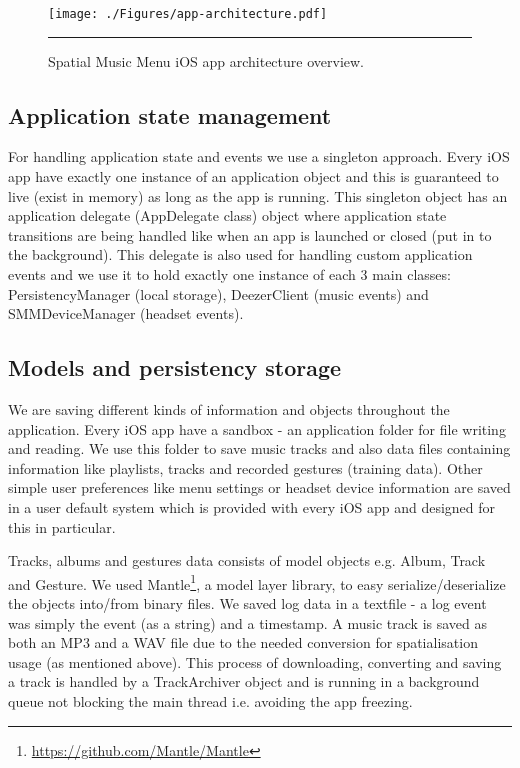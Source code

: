 \begin{figure}[t]
  \centering
    \texttt{[image: ./Figures/app-architecture.pdf]}
    \rule{35em}{1pt}
  \caption[App architecture]{Spatial Music Menu iOS app architecture overview.}
  \label{fig:apparchitecture}
\end{figure}

\subsection{Application state management}
For handling application state and events we use a singleton approach. Every iOS app have exactly one instance of an application object and this is guaranteed to live (exist in memory) as long as the app is running. This singleton object has an application delegate (AppDelegate class) object where application state transitions are being handled like when an app is launched or closed (put in to the background). This delegate is also used for handling custom application events and we use it to hold exactly one instance of each 3 main classes: PersistencyManager (local storage), DeezerClient (music events) and SMMDeviceManager (headset events). 

\subsection{Models and persistency storage}
\label{sec:modelsandpersistency}
We are saving different kinds of information and objects throughout the application. Every iOS app have a sandbox - an application folder for file writing and reading. We use this folder to save music tracks and also data files containing information like playlists, tracks and recorded gestures (training data). Other simple user preferences like menu settings or headset device information are saved in a user default system which is provided with every iOS app and designed for this in particular.

Tracks, albums and gestures data consists of model objects e.g. Album, Track and Gesture. We used Mantle\footnote{\url{https://github.com/Mantle/Mantle}}, a model layer library, to easy serialize/deserialize the objects into/from binary files. We saved log data in a textfile - a log event was simply the event (as a string) and a timestamp. A music track is saved as both an MP3 and a WAV file due to the needed conversion for spatialisation usage (as mentioned above). This process of downloading, converting and saving a track is handled by a TrackArchiver object and is running in a background queue not blocking the main thread i.e. avoiding the app freezing.

